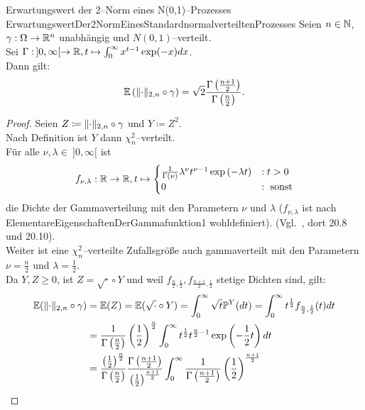 \begin{lemma}{Erwartungswert der 2--Norm eines N(0,1)--Prozesses}
             {ErwartungswertDer2NormEinesStandardnormalverteiltenProzesses}
Seien $n \in \mathbb{N}$, $\gamma : \Omega \rightarrow \mathbb{R}^n$ unabhängig und
$N(0,1)$--verteilt.\\
Sei $\Gamma:\!\  ]0, \infty[ \rightarrow \mathbb{R}, 
             t \mapsto \int_0^\infty x^{t-1}\exp(-x)dx$.\\
Dann gilt:
\[\mathbb{E}\left(\lVert\cdot\rVert_{2, n} \circ \gamma \right)
= \sqrt 2\frac{\Gamma\left(\frac{n+1}2\right)}{\Gamma\left(\frac n 2 \right)}
\text.\]
\end{lemma}
\begin{proof}
Seien $Z \coloneqq  \lVert\cdot\rVert_{2, n}\circ \gamma$ und $Y \coloneqq  Z^2$.\\
Nach Definition ist $Y$ dann $\chi^2_n$--verteilt.\\
Für alle $\nu, \lambda \in \!\ ]0, \infty[$ ist 
\[ f_{\nu, \lambda}: \mathbb{R} \rightarrow \mathbb{R}, t \mapsto
	\begin{cases}
\frac 1 {\Gamma(\nu)}\lambda^\nu t^{\nu -1}\exp\left(-\lambda t\right) &:t> 0\\
0 & :\text{ sonst}
	\end{cases}
\]
die Dichte der Gammaverteilung mit den Parametern $\nu$ und $\lambda$
($f_{\nu, \lambda}$ ist nach~
{ElementareEigenschaftenDerGammafunktion1} wohldefiniert). (Vgl.~\cite{Irle},
dort 20.8 und 20.10).\\
Weiter ist eine $\chi_n^2$--verteilte Zufallsgröße auch gammaverteilt mit den
Parametern $\nu = \frac n 2$ und $\lambda = \frac 1 2$.\\
Da $Y, Z \ge 0$, ist $Z = \sqrt\cdot \circ Y$ und
weil $f_{\frac n 2, \frac 1 2}, f_{\frac {n+1}2, \frac 1 2}$ stetige
Dichten sind, gilt:
\begin{align*}
\E(\norm\cdot_{2, n} \circ \gamma) &= \E(Z) = \E(\sqrt\cdot \circ Y)
 = \int_{0}^\infty\sqrt t \Prim^Y(dt) 
 = \int_0^\infty t^{\frac 1 2}f_{\frac n 2, \frac 1 2}(t) dt\\
 &= \frac 1 {\Gamma\left(\frac n 2 \right)} \left(\frac 1 2 \right)^{\frac n 2}
 \int_0^\infty t^{\frac 1 2}t^{\frac n 2 - 1}\exp\left(-\frac 1 2 t \right)dt\\
 &= \frac {\left(\frac 1 2 \right)^{\frac n 2}} {\Gamma\left(\frac n 2\right)} 
\frac{\Gamma\left(\frac{n+1}2 \right)}{\left(\frac 12\right)^{\frac{n+1}{2}}}
\int_0^\infty \frac 1 {\Gamma\left(\frac{n+1}2 \right)}
                      \left(\frac 12\right)^{\frac{n+1}{2}}

\end{align*}
\end{proof}
